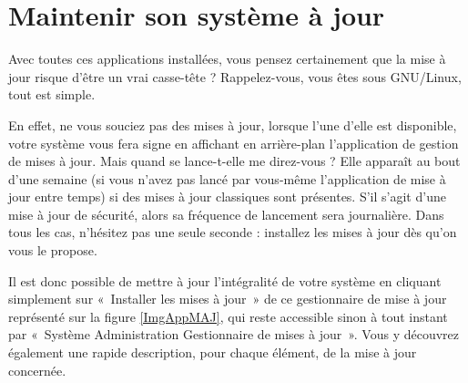 {\section{Maintenir son système à jour}
Avec toutes ces applications installées, vous pensez certainement que la mise à jour risque d'être un vrai casse-tête ? Rappelez-vous, vous êtes sous GNU/Linux, tout est simple.\par
En effet, ne vous souciez pas des mises à jour, lorsque l'une d'elle est disponible, votre système vous fera signe en affichant en arrière-plan l'application de gestion de mises à jour. Mais quand se lance-t-elle me direz-vous ? Elle apparaît au bout d'une semaine (si vous n'avez pas lancé par vous-même l'application de mise à jour entre temps) si des mises à jour classiques sont présentes. S'il s'agit d'une mise à jour de sécurité, alors sa fréquence de lancement sera journalière. Dans tous les cas, n'hésitez pas une seule seconde : installez les mises à jour dès qu'on vous le propose.\par
Il est donc possible de mettre à jour l'intégralité de votre système en cliquant simplement sur «~Installer les mises à jour~» de ce gestionnaire de mise à jour représenté sur la figure \ref{ImgAppMAJ}, qui reste accessible sinon à tout instant par «~Système \FlecheDroite Administration \FlecheDroite Gestionnaire de mises à jour~». Vous y découvrez également une rapide description, pour chaque élément, de la mise à jour concernée.
}
